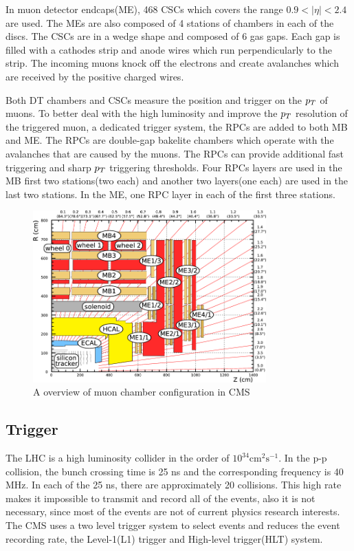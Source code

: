 In muon detector endcaps(ME), 468 CSCs which covers the range $0.9<|\eta|<2.4$ are used. The MEs are also composed of 4 stations of chambers in each of the discs. The CSCs are in a wedge shape and composed of 6 gas gaps. Each gap is filled with a cathodes strip and anode wires which run perpendicularly to the strip. The incoming muons knock off the electrons and create avalanches which are received by the positive charged wires. 

Both DT chambers and CSCs measure the position and trigger on the $p_{T}$ of muons. To better deal with the high luminosity and improve the $p_{T}$ resolution of the triggered muon, a dedicated trigger system, the RPCs are added to both MB and ME. The RPCs are double-gap bakelite chambers which operate with the avalanches that are caused by the muons. The RPCs can provide additional fast triggering and sharp $p_{T}$ triggering thresholds. Four RPCs layers are used in the MB first two stations(two each) and another two layers(one each) are used in the last two stations.  In the ME, one RPC layer in each of the first three stations.    



\begin{figure}[htbp] 
\centering
\includegraphics[width=0.8\textwidth]{chapter3/Muon_chambers.png}
\caption[A overview of muon chamber configuration in CMS]{A overview of muon chamber configuration in CMS~\cite{Muon_chambers}}
\label{fig:muon_sketch}
\end{figure}


\subsection{Trigger}

The LHC is a high luminosity collider in the order of $10^{34}\textrm{cm}^{2}\textrm{s}^{-1}$. In the p-p collision, the bunch crossing time is 25 ns and the corresponding frequency is 40 MHz. In each of the 25 ns, there are approximately 20 collisions. This high rate makes it impossible to transmit and record all of the events, also it is not necessary, since most of the events are not of current physics research interests. The CMS uses a two level trigger system to select events and reduces the event recording rate, the Level-1(L1) trigger and High-level trigger(HLT) system. 


